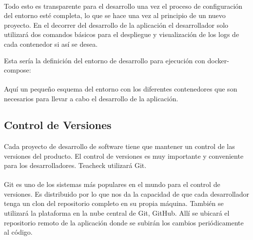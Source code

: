 \paragraph{}
Todo esto es transparente para el desarrollo una vez el proceso de configuración del entorno esté completa, lo que se hace una vez al principio de un nuevo proyecto. En el decorrer del desarrollo de la aplicación el desarrollador solo utilizará dos comandos básicos para el despliegue y visualización de los logs de cada contenedor si así se desea.

Esta sería la definición del entorno de desarrollo para ejecución con docker-compose:

\paragraph{}
Aquí un pequeño esquema del entorno con los diferentes contenedores que son necesarios para llevar a cabo el desarrollo de la aplicación.

\subsection{Control de Versiones}
\paragraph{}
Cada proyecto de desarrollo de software tiene que mantener un control de las versiones del producto. El control de versiones es muy importante y conveniente para los desarrolladores.
Teacheck utilizará Git.

\paragraph{}
Git es uno de los sistemas más populares en el mundo para el control de versiones. Es distribuido por lo que nos da la capacidad de que cada desarrollador tenga un clon del repositorio completo en su propia máquina. También se utilizará la plataforma en la nube central de Git, GitHub. Allí se ubicará el repositorio remoto de la aplicación donde se subirán los cambios periódicamente al código.

